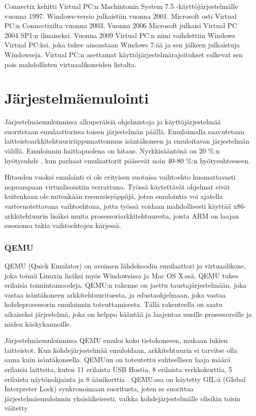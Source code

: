 Connectix kehitti Virtual PC:n Machintonin System 7.5 -käyttöjärjestelmälle vuonna 1997. Windows-versio julkaistiin vuonna 2001. Microsoft osti Virtual PC:n Connectixilta vuonna 2003. Vuonna 2006 Microsoft julkaisi Virtual PC 2004 SP1:n ilmaiseksi. Vuonna 2009 Virtual PC:n nimi vaihdettiin Windows Virtual PC:ksi, joka tukee ainoastaan Windows 7:ää ja sen jälkeen julkaistuja Windowseja. Virtual PC:n asettamat käyttöjärjestelmärajoitukset sulkevat sen pois mahdollisten virtuaalikoneiden listalta.


\section{Järjestelmäemulointi}
Järjestelmäemuloinnissa alkuperäisiä ohjelmistoja ja käyttöjärjestelmää suoritetaan emulaattorissa toisen järjestelmän päällä. Emuloimalla saavutetaan laitteistoarkkitehtuuririippumattomuus isäntäkoneen ja emuloitavan järjestelmän välillä. Emuloinnin haittapuolena on hitaus. Nyrkkisääntönä on 20 \%:n hyötysuhde \cite{tinycc}, kun parhaat emulaattorit pääsevät noin 40-80 \%:n hyötysuhteeseen. \citep{40pperf}

Hitauden vuoksi emulointi ei ole erityisen suotuisa vaihtoehto huomattavasti nopeampaan virtualisointiin verrattuna. Työssä käytettävät ohjelmat eivät kuitenkaan ole mitenkään resurssisyöppöjä, joten emulointia voi ajatella varteenotettavana vaihtoehtona, jotta työssä voidaan mahdollisesti käyttää x86-arkkitehtuurin lisäksi muita prosessoriarkkitehtuureita, joista ARM on laajan suosionsa takia vaihtoehtojen kärjessä.

\subsubsection{QEMU}
QEMU (Quick Emulator) on avoimen lähdekoodin emulaattori ja virtuaalikone, joka toimii Linuxin lisäksi myös Windowsissa ja Mac OS X:ssä. QEMU tukee erilaisia toimintamoodeja. QEMU:n rakenne on jaettu taustajärjestelmään, joka vastaa isäntäkoneen arkkitehtuurituesta, ja edustaohjelmaan, joka vastaa kohdeprosessorin emuloinnin toteuttamisesta. Tällä rakenteella on saatu aikaiseksi järjestelmä, joka on helppo kääntää ja laajentaa uusille prosessoreille ja niiden käskykannoille. \citep{qemu_doc}

Järjestelmäemuloinnissa QEMU emuloi koko tietokoneeen, mukaan lukien laitteistot. Kun kohdejärjestelmää emuloidaan, arkkitehtuurin ei tarvitse olla sama kuin isäntäkoneella. QEMUun on toteutettu suhteellisen laaja määrä erilaisia laitteita, kuten 11 erilaista USB Hostia, 8 erilaista verkkokorttia, 5 erilaista näytönohjainta ja 8 äänikorttia \cite{qemu_doc}. QEMU:ssa on käytetty GIL:ä (Global Interpreter Lock) synkronoimaan suoritusta, joten se suorittaa järjestelmäemuloinnin yksisäikeisesti, vaikka kohdejärjestelmälle olisikin toisin väitetty \cite{qemu_tech}

